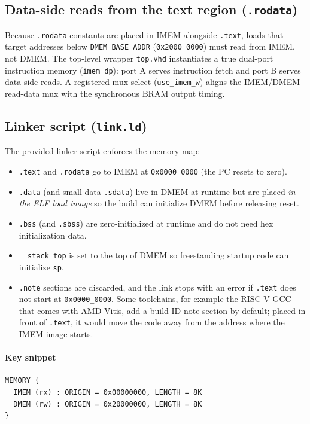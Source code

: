 \subsection{Data-side reads from the text region (\texttt{.rodata})}
Because \texttt{.rodata} constants are placed in IMEM alongside \texttt{.text},
loads that target addresses below \texttt{DMEM\_BASE\_ADDR}
(\texttt{0x2000\_0000}) must read from IMEM, not DMEM. The top-level wrapper
\texttt{top.vhd} instantiates a true dual-port instruction memory
(\texttt{imem\_dp}): port A serves instruction fetch and port B serves data-side
reads. A registered mux-select (\texttt{use\_imem\_w}) aligns the IMEM/DMEM
read-data mux with the synchronous BRAM output timing.

\subsection{Linker script (\texttt{link.ld})}
The provided linker script enforces the memory map:
\begin{itemize}[leftmargin=*]
  \item \texttt{.text} and \texttt{.rodata} go to IMEM at \texttt{0x0000\_0000} (the PC resets to zero).
  \item \texttt{.data} (and small-data \texttt{.sdata}) live in DMEM at runtime but are placed \emph{in the ELF load image} so the build can initialize DMEM before releasing reset.
  \item \texttt{.bss} (and \texttt{.sbss}) are zero-initialized at runtime and do not need hex initialization data.
  \item \texttt{\_\_stack\_top} is set to the top of DMEM so freestanding startup code can initialize \texttt{sp}.
  \item \texttt{.note} sections are discarded, and the link stops with an error if \texttt{.text} does not start at \texttt{0x0000\_0000}. Some toolchains, for example the RISC-V GCC that comes with AMD Vitis, add a build-ID note section by default; placed in front of \texttt{.text}, it would move the code away from the address where the IMEM image starts.
\end{itemize}

\paragraph{Key snippet}
\begin{lstlisting}[style=minrv]
MEMORY {
  IMEM (rx) : ORIGIN = 0x00000000, LENGTH = 8K
  DMEM (rw) : ORIGIN = 0x20000000, LENGTH = 8K
}
\end{lstlisting}

